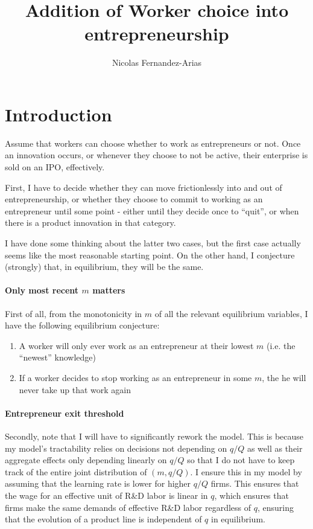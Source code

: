 \documentclass[11pt,english]{article}
\theoremstyle{remark}
\begin{document}
	
\title{Addition of Worker choice into entrepreneurship}
\author{Nicolas Fernandez-Arias}
\maketitle

\section{Introduction}

Assume that workers can choose whether to work as entrepreneurs or not. Once an innovation occurs, or whenever they choose to not be active, their enterprise is sold on an IPO, effectively.

First, I have to decide whether they can move frictionlessly into and out of entrepreneurship, or whether they choose to commit to working as an entrepreneur until some point - either until they decide once to ``quit'', or when there is a product innovation in that category.

I have done some thinking about the latter two cases, but the first case actually seems like the most reasonable starting point. On the other hand, I conjecture (strongly) that, in equilibrium, they will be the same.

\paragraph{Only most recent $m$ matters}First of all, from the monotonicity in $m$ of all the relevant equilibrium variables, I have the following equilibrium conjecture:

\begin{enumerate}
	\item A worker will only ever work as an entrepreneur at their lowest $m$ (i.e. the ``newest'' knowledge)
	\item If a worker decides to stop working as an entrepreneur in some $m$, the he will never take up that work again
\end{enumerate} 

\paragraph{Entrepreneur exit threshold}Secondly, note that I will have to significantly rework the model. This is because my model's tractability relies on decisions not depending on $q/Q$ as well as their aggregate effects only depending linearly on $q/Q$ so that I do not have to keep track of the entire joint distribution of $(m,q/Q)$. I ensure this in my model by assuming that the learning rate is lower for higher $q/Q$ firms. This ensures that the wage for an effective unit of R\&D labor is linear in $q$, which ensures that firms make the same demands of effective R\&D labor regardless of $q$, ensuring that the evolution of a product line is independent of $q$ in equilibrium.
\end{document}

